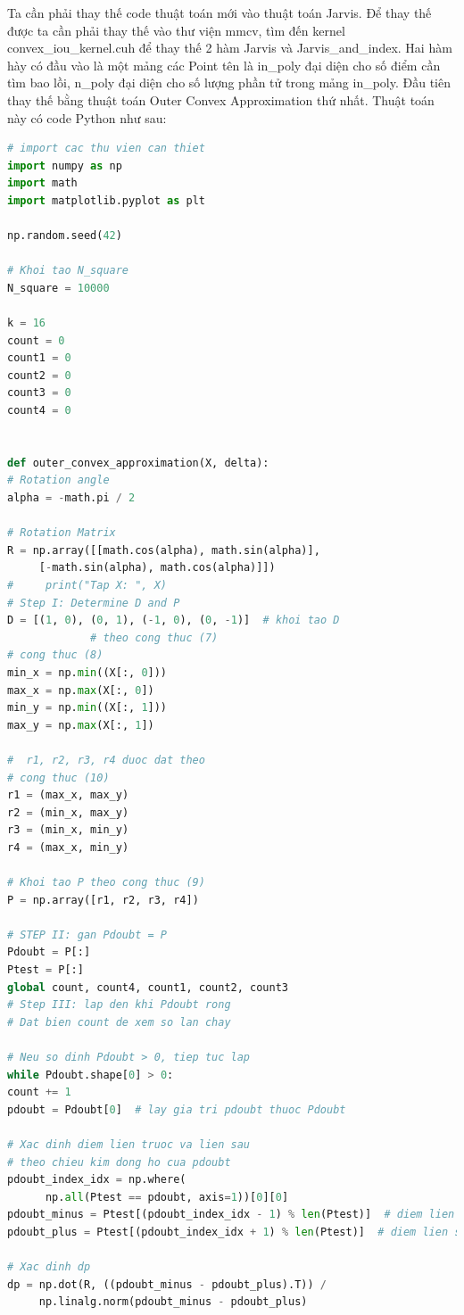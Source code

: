 \documentclass[12pt,a4paper,openany,oneside]{report}
\begin{document}
Ta cần phải thay thế code thuật toán mới vào thuật toán Jarvis. Để thay thế được ta cần phải thay thế vào thư viện mmcv, tìm đến kernel convex\_iou\_kernel.cuh để thay thế 2 hàm Jarvis và Jarvis\_and\_index. Hai hàm hày có đầu vào là một mảng các Point tên là in\_poly đại diện cho số điểm cần tìm bao lồi, n\_poly đại diện cho số lượng phần tử trong mảng in\_poly. Đầu tiên thay thế bằng thuật toán Outer Convex Approximation thứ nhất. Thuật toán này có code Python như sau:

\begin{lstlisting}[language=Python, caption={Mô tả mã nguồn Python}, label={lst:python-code}]
# import cac thu vien can thiet
import numpy as np
import math
import matplotlib.pyplot as plt

np.random.seed(42)

# Khoi tao N_square
N_square = 10000

k = 16
count = 0
count1 = 0
count2 = 0
count3 = 0
count4 = 0


def outer_convex_approximation(X, delta):
# Rotation angle
alpha = -math.pi / 2

# Rotation Matrix
R = np.array([[math.cos(alpha), math.sin(alpha)], 
	 [-math.sin(alpha), math.cos(alpha)]])
#     print("Tap X: ", X)
# Step I: Determine D and P
D = [(1, 0), (0, 1), (-1, 0), (0, -1)]  # khoi tao D
       		 # theo cong thuc (7)
# cong thuc (8)
min_x = np.min((X[:, 0]))
max_x = np.max(X[:, 0])
min_y = np.min((X[:, 1]))
max_y = np.max(X[:, 1])

#  r1, r2, r3, r4 duoc dat theo
# cong thuc (10)
r1 = (max_x, max_y)
r2 = (min_x, max_y)
r3 = (min_x, min_y)
r4 = (max_x, min_y)

# Khoi tao P theo cong thuc (9)
P = np.array([r1, r2, r3, r4]) 

# STEP II: gan Pdoubt = P
Pdoubt = P[:]
Ptest = P[:]
global count, count4, count1, count2, count3
# Step III: lap den khi Pdoubt rong
# Dat bien count de xem so lan chay

# Neu so dinh Pdoubt > 0, tiep tuc lap
while Pdoubt.shape[0] > 0: 
count += 1
pdoubt = Pdoubt[0]  # lay gia tri pdoubt thuoc Pdoubt

# Xac dinh diem lien truoc va lien sau
# theo chieu kim dong ho cua pdoubt
pdoubt_index_idx = np.where(
      np.all(Ptest == pdoubt, axis=1))[0][0]
pdoubt_minus = Ptest[(pdoubt_index_idx - 1) % len(Ptest)]  # diem lien truoc
pdoubt_plus = Ptest[(pdoubt_index_idx + 1) % len(Ptest)]  # diem lien sau

# Xac dinh dp
dp = np.dot(R, ((pdoubt_minus - pdoubt_plus).T)) /
	 np.linalg.norm(pdoubt_minus - pdoubt_plus)


\end{lstlisting}
\end{document}
